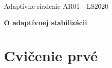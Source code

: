 \documentclass[a4paper, 10pt, ]{article}
\def\oznacenieCasti{AR01 - LS2020}
\begin{document}
\fontsize{12pt}{22pt}\selectfont

\centerline{\textsf{Adaptívne riadenie} \hfill \textsf{\oznacenieCasti}}

\fontsize{18pt}{22pt}\selectfont





\begin{flushleft}
	\textbf{\textsf{O adaptívnej stabilizácii}}
\end{flushleft}





\normalsize

\bigskip

\tableofcontents

\bigskip

\vspace{18pt}











\section{Cvičenie prvé}
\label{cvprve}
\end{document}

